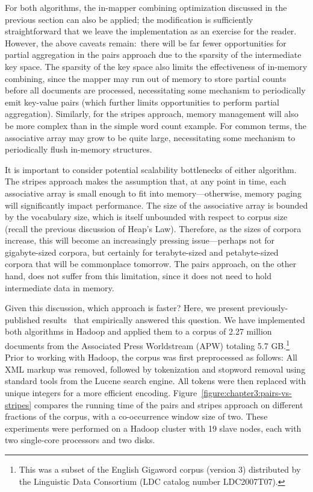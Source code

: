 \documentclass[11pt]{article}
\begin{document}
For both algorithms, the in-mapper combining optimization discussed in
the previous section can also be applied; the modification is
sufficiently straightforward that we leave the implementation as an
exercise for the reader.  However, the above caveats remain:\ there
will be far fewer opportunities for partial aggregation in the pairs
approach due to the sparsity of the intermediate key space.  The
sparsity of the key space also limits the effectiveness of in-memory
combining, since the mapper may run out of memory to store partial
counts before all documents are processed, necessitating some
mechanism to periodically emit key-value pairs (which further limits
opportunities to perform partial aggregation).  Similarly, for the
stripes approach, memory management will also be more complex than in
the simple word count example.  For common terms, the associative
array may grow to be quite large, necessitating some mechanism to
periodically flush in-memory structures.

It is important to consider potential scalability bottlenecks of
either algorithm.  The stripes approach makes the assumption that, at
any point in time, each associative array is small enough to fit into
memory---otherwise, memory paging will significantly impact
performance.  The size of the associative array is bounded by the
vocabulary size, which is itself unbounded with respect to corpus size
(recall the previous discussion of Heap's Law).  Therefore, as the
sizes of corpora increase, this will become an increasingly pressing
issue---perhaps not for gigabyte-sized corpora, but certainly for
terabyte-sized and petabyte-sized corpora that will be commonplace
tomorrow.  The pairs approach, on the other hand, does not suffer from
this limitation, since it does not need to hold intermediate data in
memory.

Given this discussion, which approach is faster?  Here, we present
previously-published results~\cite{Lin_EMNLP2008} that empirically
answered this question.  We have implemented both algorithms in Hadoop
and applied them to a corpus of 2.27 million documents from the
Associated Press Worldstream (APW) totaling 5.7 GB.\footnote{This was
  a subset of the English Gigaword corpus (version 3) distributed by
  the Linguistic Data Consortium (LDC catalog number LDC2007T07).}
Prior to working with Hadoop, the corpus was first preprocessed as
follows: All XML markup was removed, followed by tokenization and
stopword removal using standard tools from the Lucene search engine.
All tokens were then replaced with unique integers for a more
efficient encoding.  Figure~\ref{figure:chapter3:pairs-vs-stripes}
compares the running time of the pairs and stripes approach on
different fractions of the corpus, with a co-occurrence window size of
two.  These experiments were performed on a Hadoop cluster with 19
slave nodes, each with two single-core processors and two disks.
\end{document}
